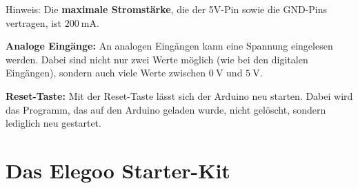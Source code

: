 Hinweis: Die \textbf{maximale Stromstärke}, die der 5V-Pin sowie die GND-Pins vertragen, ist \textbf{$\SI{200}{\milli\ampere}$}.

\textbf{Analoge Eingänge:} An analogen Eingängen kann eine Spannung eingelesen werden. Dabei sind nicht nur zwei Werte möglich (wie bei den digitalen Eingängen), sondern auch viele Werte zwischen $\SI{0}{\volt}$ und $\SI{5}{\volt}$.

\textbf{Reset-Taste:} Mit der Reset-Taste lässt sich der Arduino neu starten. Dabei wird das Programm, das auf den Arduino geladen wurde, nicht gelöscht, sondern lediglich neu gestartet.

\section{Das Elegoo Starter-Kit}
\label{sec:starter_kit_elegoo}


